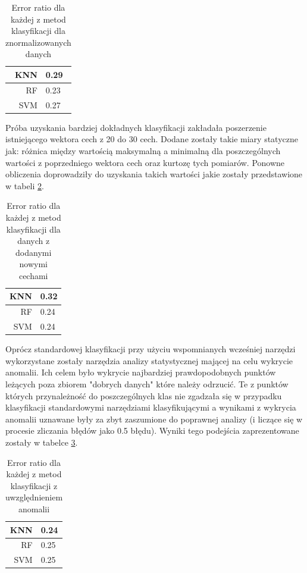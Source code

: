 \documentclass[a4paper]{report}
\begin{document}
\begin{table}[!htp]
    \centering
    \begin{tabular}{|r|l|}
      \hline 
      KNN & 0.29 \\
      \hline
      RF & 0.23 \\
      \hline
      SVM & 0.27 \\
      \hline
    \end{tabular} 
    
    \caption{Error ratio dla każdej z metod klasyfikacji dla znormalizowanych danych}
    \label{results1}
\end{table}

Próba uzyskania bardziej dokładnych klasyfikacji zakładała poszerzenie istniejącego wektora cech z 20 do 30 cech. Dodane zostały takie miary statyczne jak: różnica między wartością maksymalną a minimalną dla poszczególnych wartości z poprzedniego wektora cech oraz kurtozę tych pomiarów. Ponowne obliczenia doprowadziły do uzyskania takich wartości jakie zostały przedstawione w tabeli \ref{results2}.

\begin{table}[!htp]
    \centering
    \begin{tabular}{|r|l|}
      \hline 
      KNN & 0.32 \\
      \hline
      RF & 0.24 \\
      \hline
      SVM & 0.24 \\
      \hline
    \end{tabular} 
    
    \caption{Error ratio dla każdej z metod klasyfikacji dla danych z dodanymi nowymi cechami}
    \label{results2}
\end{table}

Oprócz standardowej klasyfikacji przy użyciu wspomnianych wcześniej narzędzi wykorzystane zostały narzędzia analizy statystycznej mającej na celu wykrycie anomalii. Ich celem było wykrycie najbardziej prawdopodobnych punktów leżących poza zbiorem "dobrych danych" które należy odrzucić. Te z punktów których przynależność do poszczególnych klas nie zgadzała się w przypadku klasyfikacji standardowymi narzędziami klasyfikującymi a wynikami z wykrycia anomalii uznawane były za zbyt zaszumione do poprawnej analizy (i liczące się w procesie zliczania błędów jako 0.5 błędu). Wyniki tego podejścia zaprezentowane zostały w tabelce \ref{results3}.

\begin{table}[!htp]
    \centering
    \begin{tabular}{|r|l|}
      \hline 
      KNN & 0.24 \\
      \hline
      RF & 0.25 \\
      \hline
      SVM & 0.25 \\
      \hline
    \end{tabular} 
    
    \caption{Error ratio dla każdej z metod klasyfikacji z uwzględnieniem anomalii}
    \label{results3}
\end{table}
\end{document}
